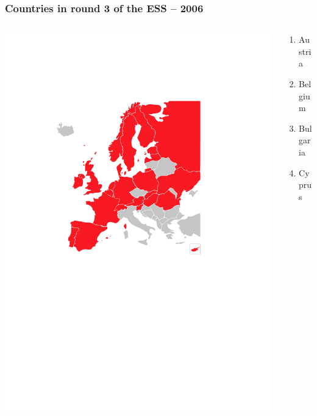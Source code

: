 \documentclass{beamer}
\begin{document}
\begin{frame}

\frametitle{Countries in round 3 of the ESS -- 2006}

	\begin{columns}[T]	
		\begin{column}{6.5cm}
			\includegraphics[width=\textwidth]{i/round3.pdf}
		\end{column}
		\begin{column}{4.5cm}
			\begin{columns}	
				\begin{column}{2cm}
					\begin{scriptsize}\begin{enumerate}
						\item Austria
						\item Belgium 	
						\item Bulgaria 	
						\item Cyprus 	

\end{enumerate}
\end{scriptsize}
\end{column}
\end{columns}
\end{column}
\end{columns}
\end{frame}
\end{document}
